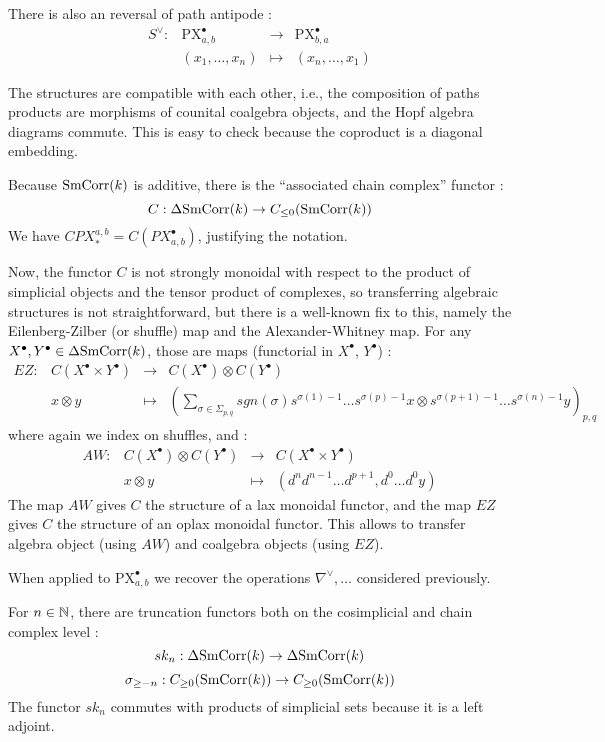 There is also an reversal of path antipode :
\[
\begin{array}{cccc} S^{\vee}: &\mathrm{PX}^\bullet_{a,b} & \rightarrow &\mathrm{PX}^\bullet_{b,a}\\ & (x_1,\ldots,x_n) & \mapsto & (x_n,\ldots,x_1)\end{array}
\]

The structures are compatible with each other, i.e., the composition of paths products are morphisms of counital coalgebra objects, and the Hopf algebra diagrams commute. This is easy to check because the coproduct is a diagonal embedding.

Because $\mathrm{SmCorr}(k)$ is additive, there is the ``associated chain complex'' functor :
\[
C:\Delta\mathrm{SmCorr}(k)\rightarrow C_{\leq 0}(\mathrm{SmCorr}(k))
\]
We have $CPX^{a,b}_*=C(PX^\bullet_{a,b})$, justifying the notation.

Now, the functor $C$ is not strongly monoidal with respect to the product of simplicial objects and the tensor product of complexes, so transferring algebraic structures is not straightforward, but there is a well-known fix to this, namely the Eilenberg-Zilber (or shuffle) map and the Alexander-Whitney map. For any $X^\bullet,Y^\bullet\in \Delta\mathrm{SmCorr}(k)$, those are maps (functorial in $X^\bullet$, $Y^\bullet$) :
\[
\begin{array}{cccc}
EZ :& C(X^\bullet\times Y^\bullet) &\rightarrow & C(X^\bullet)\otimes C(Y^\bullet)\\
& x\otimes y & \mapsto & (\sum_{\sigma\in \Sigma_{p,q}}sgn(\sigma)s^{\sigma(1)-1}\ldots s^{\sigma(p)-1}x\otimes s^{\sigma(p+1)-1}\ldots s^{\sigma(n)-1}y)_{p,q}
\end{array}
\]
where again we index on shuffles, and :
\[
\begin{array}{cccc}
AW :& C(X^\bullet)\otimes C(Y^\bullet)&\rightarrow & C(X^\bullet\times Y^\bullet)\\
& x\otimes y & \mapsto & (d^nd^{n-1}\ldots d^{p+1},d^0\ldots d^0y)
\end{array}
\]
The map $AW$ gives $C$ the structure of a lax monoidal functor, and the map $EZ$ gives $C$ the structure of an oplax monoidal functor. This allows to transfer algebra object (using $AW$) and coalgebra objects (using $EZ$). 

When applied to $\mathrm{PX}^{\bullet}_{a,b}$ we recover the operations $\nabla^{\vee},\ldots$ considered previously. 

For $n\in\mathbb{N}$, there are truncation functors both on the cosimplicial and chain complex level :
\[
sk_n:\Delta\mathrm{SmCorr}(k)\rightarrow \Delta\mathrm{SmCorr}(k)
\]
\[
\sigma_{\geq -n}:C_{\geq 0}(\mathrm{SmCorr}(k))\rightarrow C_{\geq 0}(\mathrm{SmCorr}(k))
\]
The functor $sk_n$ commutes with products of simplicial sets because it is a left adjoint.


